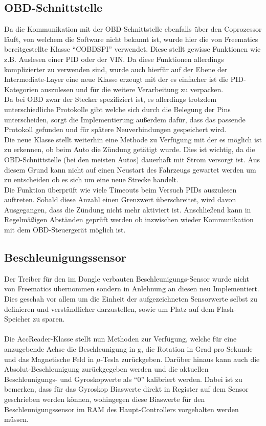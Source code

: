 \subsection{ \ac{OBD}-Schnittstelle}
	Da die Kommunikation mit der \ac{OBD}-Schnittstelle ebenfalls über den Coprozessor läuft, von welchem die Software nicht bekannt ist, wurde hier die von Freematics bereitgestellte Klasse \enquote{COBDSPI} verwendet. Diese stellt gewisse Funktionen wie z.B. Auslesen einer \ac{PID} oder der \ac{VIN}. Da diese Funktionen allerdings komplizierter zu verwenden sind, wurde auch hierfür auf der Ebene der Intermediate-Layer eine neue Klasse erzeugt mit der es einfacher ist die \ac{PID}-Kategorien auszulesen und für die weitere Verarbeitung zu verpacken.
	\\
	Da bei \ac{OBD} zwar der Stecker spezifiziert ist, es allerdings trotzdem unterschiedliche Protokolle gibt welche sich durch die Belegung der Pins unterscheiden, sorgt die Implementierung außerdem dafür, dass das passende Protokoll gefunden und für spätere Neuverbindungen gespeichert wird.
	\\
	Die neue Klasse stellt weiterhin eine Methode zu Verfügung mit der es möglich ist zu erkennen, ob beim Auto die Zündung getätigt wurde. Dies ist wichtig, da die \ac{OBD}-Schnittstelle (bei den meisten Autos) dauerhaft mit Strom versorgt ist. Aus diesem Grund kann nicht auf einen Neustart des Fahrzeugs gewartet werden um zu entscheiden ob es sich um eine neue Strecke handelt.
	\\
	Die Funktion überprüft wie viele Timeouts beim Versuch \acp{PID} auszulesen auftreten. Sobald diese Anzahl einen Grenzwert überschreitet, wird davon Ausgegangen, dass die Zündung nicht mehr aktiviert ist. Anschließend kann in Regelmäßigen Abständen geprüft werden ob inzwischen wieder Kommunikation mit dem \ac{OBD}-Steuergerät möglich ist. 
	


\subsection{Beschleunigungssensor}
Der Treiber für den im Dongle verbauten Beschleunigungs-Sensor wurde nicht von Freematics übernommen sondern in Anlehnung an diesen neu Implementiert. Dies geschah vor allem um die Einheit der aufgezeichneten Sensorwerte selbst zu definieren und verständlicher darzustellen, sowie um Platz auf dem Flash-Speicher zu sparen.
\paragraph{}
Die AccReader-Klasse stellt nun Methoden zur Verfügung, welche für eine anzugebende Achse die Beschleunigung in g, die Rotation in Grad pro Sekunde und das Magnetische Feld in $\mu$-Tesla zurückgeben. Darüber hinaus kann auch die Absolut-Beschleunigung zurückgegeben werden und die aktuellen Beschleunigungs- und Gyroskopwerte als \enquote{0} kalibriert werden. Dabei ist zu bemerken, dass für das Gyroskop Biaswerte direkt in Register auf dem Sensor geschrieben werden können, wohingegen diese Biaswerte für den Beschleunigungssensor im RAM des Haupt-Controllers vorgehalten werden müssen.
